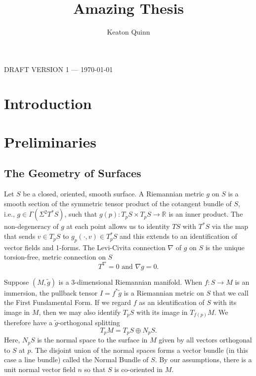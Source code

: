 \documentclass{amsart}
\newcommand{\R}{\mathbb{R}}
\begin{document}
\title{Amazing Thesis}

\author{Keaton Quinn}

\maketitle

\begin{center} {\sf DRAFT VERSION 1 --- {\today} } \end{center}



\section{Introduction}

\section{Preliminaries}

\subsection{The Geometry of Surfaces}

Let $S$ be a closed, oriented, smooth surface. 
A Riemannian metric $g$ on $S$ is a smooth section of the symmetric tensor product of the cotangent bundle of $S$, i.e., $g \in \Gamma(\Sigma^2T^*S)$, such that $g(p): T_pS \times T_pS \to \R$ is an inner product.
The non-degeneracy of $g$ at each point allows us to identity $TS$ with $T^*S$ via the map that sends $v \in T_pS$ to $g_p(\cdot  , v) \in T_p^*S$ and this extends to an identification of vector fields and 1-forms. 
The Levi-Civita connection $\nabla$ of $g$ on $S$ is the unique torsion-free, metric connection on $S$ 
\[
T^\nabla = 0 \text{ and } \nabla g = 0.
\]

Suppose $(M,\tilde{g})$ is a 3-dimensional Riemannian manifold. 
When $f: S \to M$ is an immersion, the pullback tensor $I = f^*\tilde{g}$ is a Riemannian metric on $S$ that we call the First Fundamental Form. 
If we regard $f$ as an identification of $S$ with its image in $M$, then we may also identify $T_pS$ with its image in $T_{f(p)}M$.
We therefore have a $\tilde{g}$-orthogonal splitting
\[
T_pM = T_pS \oplus N_pS.
\]
Here, $N_pS$ is the normal space to the surface in $M$ given by all vectors orthogonal to $S$ at $p$.
The disjoint union of the normal spaces forms a vector bundle (in this case a line bundle) called the Normal Bundle of $S$.
By our assumptions, there is a unit normal vector field $n$ so that $S$ is co-oriented in $M$.
\end{document}
